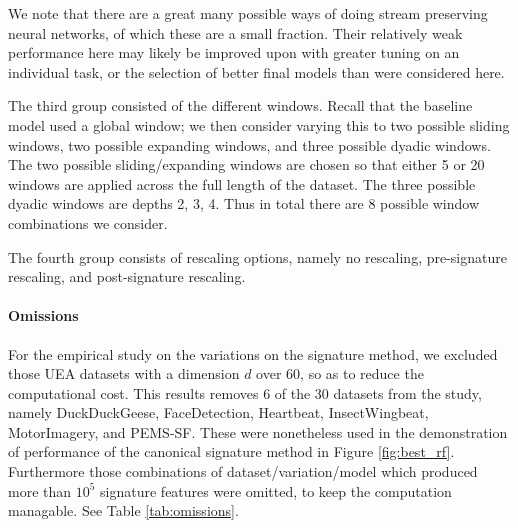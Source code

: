 \documentclass{article}
\theoremstyle{definition}
\theoremstyle{remark}
\begin{document}
	We note that there are a great many possible ways of doing stream preserving neural networks, of which these are a small fraction. Their relatively weak performance here may likely be improved upon with greater tuning on an individual task, or the selection of better final models than were considered here.
	
	The third group consisted of the different windows. Recall that the baseline model used a global window; we then consider varying this to two possible sliding windows, two possible expanding windows, and three possible dyadic windows. The two possible sliding/expanding windows are chosen so that either 5 or 20 windows are applied across the full length of the dataset. The three possible dyadic windows are depths 2, 3, 4. Thus in total there are 8 possible window combinations we consider.
	
	The fourth group consists of rescaling options, namely no rescaling, pre-signature rescaling, and post-signature rescaling.
	
	\paragraph{Omissions}
	For the empirical study on the variations on the signature method, we excluded those UEA datasets with a dimension $d$ over 60, so as to reduce the computational cost. This results removes 6 of the 30 datasets from the study, namely DuckDuckGeese, FaceDetection, Heartbeat, InsectWingbeat, MotorImagery, and PEMS-SF. These were nonetheless used in the demonstration of performance of the canonical signature method in Figure \ref{fig:best_rf}. Furthermore those combinations of dataset/variation/model which produced more than $10^5$ signature features were omitted, to keep the computation managable. See Table \ref{tab:omissions}.
\end{document}
